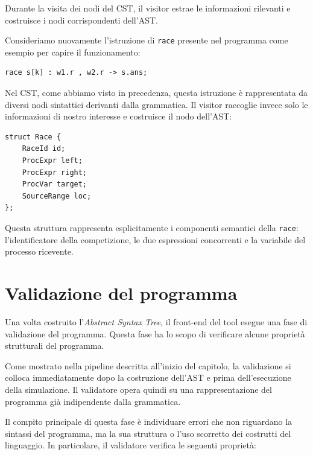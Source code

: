 Durante la visita dei nodi del CST, il visitor estrae le informazioni rilevanti e costruisce i nodi corrispondenti dell’AST.

Consideriamo nuovamente l’istruzione di \texttt{race} presente nel programma come esempio per capire il funzionamento:

\begin{tcolorbox}[colback=white,colframe=black!35,boxrule=0.4pt]
\begin{lstlisting}
race s[k] : w1.r , w2.r -> s.ans;
\end{lstlisting}
\end{tcolorbox}

Nel CST, come abbiamo visto in precedenza, questa istruzione è rappresentata da diversi nodi sintattici derivanti dalla grammatica. Il visitor raccoglie invece solo le informazioni di nostro interesse e costruisce il nodo dell’AST:

\begin{tcolorbox}[colback=white,colframe=black!35,boxrule=0.4pt]
\begin{lstlisting}
struct Race {
    RaceId id;
    ProcExpr left;
    ProcExpr right;
    ProcVar target;
    SourceRange loc;
};
\end{lstlisting}
\end{tcolorbox}

Questa struttura rappresenta esplicitamente i componenti semantici della \texttt{race}: l’identificatore della competizione, le due espressioni concorrenti e la variabile del processo ricevente.
\section{Validazione del programma}

Una volta costruito l’\textit{Abstract Syntax Tree}, il front-end del tool esegue una fase di validazione del programma. Questa fase ha lo scopo di verificare alcune proprietà strutturali del programma.

Come mostrato nella pipeline descritta all’inizio del capitolo, la validazione si colloca immediatamente dopo la costruzione dell’AST e prima dell’esecuzione della simulazione. Il validatore opera quindi su una rappresentazione del programma già indipendente dalla grammatica.

Il compito principale di questa fase è individuare errori che non riguardano la sintassi del programma, ma la sua struttura o l’uso scorretto dei costrutti del linguaggio. In particolare, il validatore verifica le seguenti proprietà:

